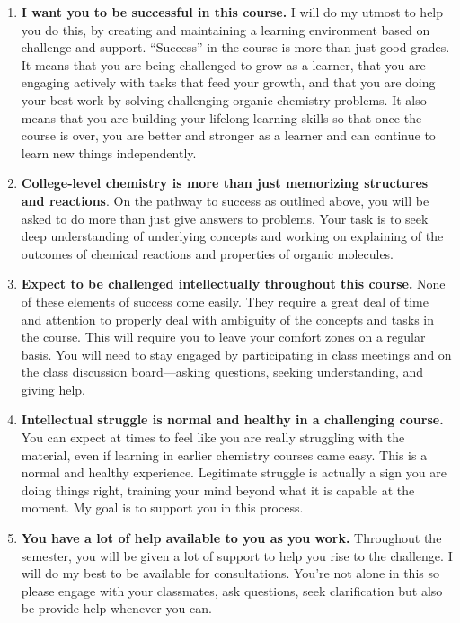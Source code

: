 \begin{enumerate}
\def\labelenumi{\arabic{enumi}.}
\tightlist
\item
  \textbf{I want you to be successful in this course.} I will do my
  utmost to help you do this, by creating and maintaining a learning
  environment based on challenge and support. ``Success'' in the course
  is more than just good grades. It means that you are being challenged
  to grow as a learner, that you are engaging actively with tasks that
  feed your growth, and that you are doing your best work by solving
  challenging organic chemistry problems. It also means that you are
  building your lifelong learning skills so that once the course is
  over, you are better and stronger as a learner and can continue to
  learn new things independently.
\item
  \textbf{College-level chemistry is more than just memorizing
  structures and reactions}. On the pathway to success as outlined
  above, you will be asked to do more than just give answers to
  problems. Your task is to seek deep understanding of underlying
  concepts and working on explaining of the outcomes of chemical
  reactions and properties of organic molecules.
\item
  \textbf{Expect to be challenged intellectually throughout this
  course.} None of these elements of success come easily. They require a
  great deal of time and attention to properly deal with ambiguity of
  the concepts and tasks in the course. This will require you to leave
  your comfort zones on a regular basis. You will need to stay engaged
  by participating in class meetings and on the class discussion
  board---asking questions, seeking understanding, and giving help.
\item
  \textbf{Intellectual struggle is normal and healthy in a challenging
  course.} You can expect at times to feel like you are really
  struggling with the material, even if learning in earlier chemistry
  courses came easy. This is a normal and healthy experience. Legitimate
  struggle is actually a sign you are doing things right, training your
  mind beyond what it is capable at the moment. My goal is to support
  you in this process.
\item
  \textbf{You have a lot of help available to you as you work.}
  Throughout the semester, you will be given a lot of support to help
  you rise to the challenge. I will do my best to be available for
  consultations. You're not alone in this so please engage with your
  classmates, ask questions, seek clarification but also be provide help
  whenever you can.
\end{enumerate}

